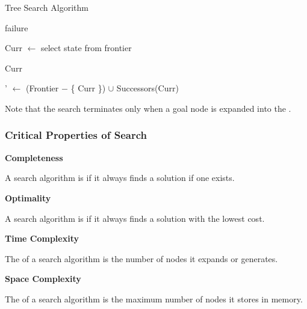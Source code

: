 \begin{algorithm}
    \caption{Tree Search Algorithm}
    
    \begin{algorithmic}[1]
                \State \Return failure
            \EndIf

            \State Curr $\gets$ select state from frontier

                \State \Return Curr
            \EndIf

            \State \Frontier' $\gets$ (Frontier $-$ \{ Curr \}) $\cup$ Successors(Curr)

            \State \Return {}
        \EndFunction
    \end{algorithmic}
\end{algorithm}


Note that the search terminates only when a goal node is expanded into the \Frontier.

\subsubsection{Critical Properties of Search}

\begin{listu}
    \item \textbf{Completeness}
    
    \begin{listu}
        \item A search algorithm is  if it always finds a solution if one exists.
    \end{listu}

    \item \textbf{Optimality}
    
    \begin{listu}
        \item A search algorithm is  if it always finds a solution with the lowest cost.
    \end{listu}

    \item \textbf{Time Complexity}
    
    \begin{listu}
        \item The  of a search algorithm is the number of nodes it expands or generates. 
    \end{listu}

    \item \textbf{Space Complexity}
    
    \begin{listu}
        \item The  of a search algorithm is the maximum number of nodes it stores in memory.
    \end{listu}
\end{listu}

